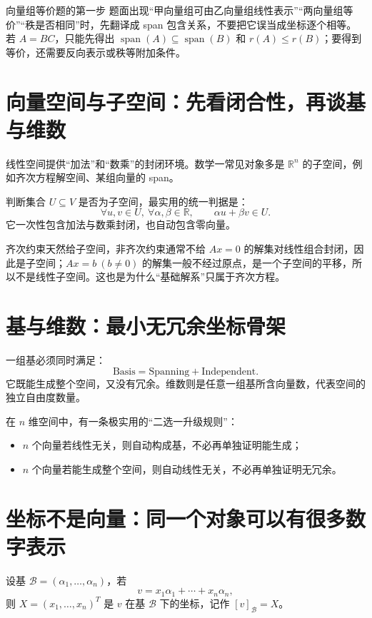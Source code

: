 \documentclass[11pt,a4paper,openany]{ctexbook}
\begin{document}
\begin{examBox}{向量组等价题的第一步}
题面出现“甲向量组可由乙向量组线性表示”“两向量组等价”“秩是否相同”时，先翻译成 span 包含关系，不要把它误当成坐标逐个相等。若 $A=BC$，只能先得出 $\operatorname{span}(A)\subseteq\operatorname{span}(B)$ 和 $r(A)\le r(B)$；要得到等价，还需要反向表示或秩等附加条件。
\end{examBox}

\section{向量空间与子空间：先看闭合性，再谈基与维数}
线性空间提供“加法”和“数乘”的封闭环境。数学一常见对象多是 $\mathbb R^n$ 的子空间，例如齐次方程解空间、某组向量的 span。

判断集合 $U\subseteq V$ 是否为子空间，最实用的统一判据是：
\[
\forall u,v\in U,\ \forall \alpha,\beta\in\mathbb R,
\qquad \alpha u+\beta v\in U.
\]
它一次性包含加法与数乘封闭，也自动包含零向量。

\begin{boundarybox}{齐次约束天然给子空间，非齐次约束通常不给}
$Ax=0$ 的解集对线性组合封闭，因此是子空间；$Ax=b\ (b\neq0)$ 的解集一般不经过原点，是一个子空间的平移，所以不是线性子空间。这也是为什么“基础解系”只属于齐次方程。
\end{boundarybox}

\section{基与维数：最小无冗余坐标骨架}
一组基必须同时满足：
\[
\boxed{\text{Basis}=\text{Spanning}+\text{Independent}}.
\]
它既能生成整个空间，又没有冗余。维数则是任意一组基所含向量数，代表空间的独立自由度数量。

在 $n$ 维空间中，有一条极实用的“二选一升级规则”：
\begin{itemize}
  \item $n$ 个向量若线性无关，则自动构成基，不必再单独证明能生成；
  \item $n$ 个向量若能生成整个空间，则自动线性无关，不必再单独证明无冗余。
\end{itemize}

\section{坐标不是向量：同一个对象可以有很多数字表示}
设基 $\mathcal B=(\alpha_1,\dots,\alpha_n)$，若
\[
v=x_1\alpha_1+\cdots+x_n\alpha_n,
\]
则 $X=(x_1,\dots,x_n)^T$ 是 $v$ 在基 $\mathcal B$ 下的坐标，记作 $[v]_{\mathcal B}=X$。
\end{document}
